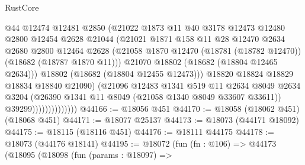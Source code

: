 \begin{lexlean}{RustCore}
\begin{coremodule}
                                @44
                                @12474
                                @12481
                                @2850
                                (@21022
                                  @1873
                                  @11
                                  @40
                                  @3178
                                  @12473
                                  @12480
                                  @2800
                                  @12454
                                  @2628
                                  @21044
                                  (@21021
                                    @1871
                                    @158
                                    @11
                                    @28
                                    @12470
                                    @2634
                                    @2680
                                    @2800
                                    @12464
                                    @2628
                                    (@21058
                                      @1870
                                      @12470
                                      (@18781 (@18782 @12470))
                                      (@18682 (@18787 @1870 @11)))
                                    @21070
                                    @18802
                                    (@18682 (@18804 @12465 @2634)))
                                  @18802
                                  (@18682 (@18804 @12455 @12473)))
                                @18820
                                @18824
                                @18829
                                @18834
                                @18840
                                @21090)
                              (@21096
                                @12483
                                @1341
                                @519
                                @11
                                @2634
                                @8049
                                @2634
                                @3204
                                (@26390 @1341 @11 @8049 (@21058 @1340 @8049 @33607 @33611))
                                @39299))))))))))))))
@44166 := @18056 @451
@44170 := @18058 (@18062 @451) (@18068 @451)
@44171 := @18077 @25137
@44173 := @18073 (@44171 @18092)
@44175 := @18115 (@18116 @451)
@44176 := @18111 @44175
@44178 := @18073 (@44176 @18141)
@44195 := @18072
    (fun (fn : @106) =>
    @44173
      (@18095
        (@18098
          (fun (params : @18097) =>

\end{coremodule}
\end{lexlean}
